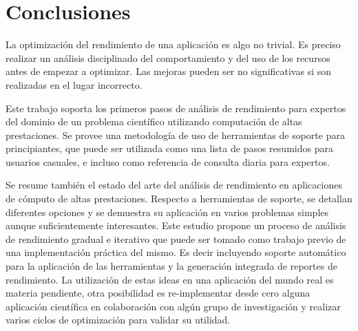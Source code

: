 \documentclass[a4paper]{report}
\begin{document}
\chapter{Conclusiones}\label{chapter:conclusions}

La optimización del rendimiento de una aplicación es algo no trivial.
Es preciso realizar un análisis disciplinado del comportamiento y del uso de los recursos antes de
empezar a optimizar. Las mejoras pueden ser no significativas si son realizadas en el lugar incorrecto.

\bigskip

Este trabajo soporta los primeros pasos de análisis de rendimiento para expertos del dominio de un problema científico utilizando computación de altas prestaciones. Se provee una metodología de uso de herramientas de soporte para principiantes, que puede ser utilizada como una lista de pasos resumidos para usuarios casuales, e incluso como referencia de consulta diaria para expertos.

\bigskip

Se resume también el estado del arte del análisis de rendimiento en
aplicaciones de cómputo de altas prestaciones. Respecto a herramientas de soporte, se detallan
diferentes opciones y se demuestra su aplicación en varios problemas simples aunque suficientemente interesantes. 
Este estudio propone un proceso de análisis de rendimiento gradual e iterativo que
puede ser tomado como trabajo previo de una implementación práctica del mismo. Es decir
incluyendo soporte automático para la aplicación de las herramientas y la generación integrada de
reportes de rendimiento. La utilización de estas ideas en una aplicación del mundo real es materia
pendiente, otra posibilidad es re-implementar desde cero alguna aplicación
científica en colaboración con algún grupo de investigación y realizar
varios ciclos de optimización para validar su utilidad.


\end{document}
